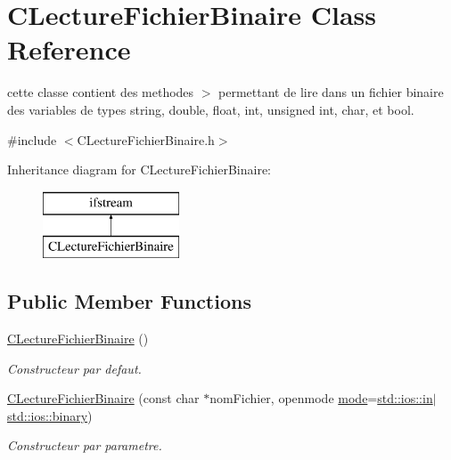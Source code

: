 \hypertarget{class_c_lecture_fichier_binaire}{\section{C\-Lecture\-Fichier\-Binaire Class Reference}
\label{class_c_lecture_fichier_binaire}
}


cette classe contient des methodes $>$ permettant de lire dans un fichier binaire des variables de types string, double, float, int, unsigned int, char, et bool.  




{\ttfamily \#include $<$C\-Lecture\-Fichier\-Binaire.\-h$>$}

Inheritance diagram for C\-Lecture\-Fichier\-Binaire\-:\begin{figure}[H]
\begin{center}
\leavevmode
\includegraphics[height=2.000000cm]{class_c_lecture_fichier_binaire}
\end{center}
\end{figure}
\subsection*{Public Member Functions}
\begin{DoxyCompactItemize}
\item 
\hyperlink{group__utilitaire_ga3a259905a2c14513846e6ecb8cf476ad}{C\-Lecture\-Fichier\-Binaire} ()
\begin{DoxyCompactList}\small\item\em Constructeur par defaut. \end{DoxyCompactList}\item 
\hyperlink{group__utilitaire_gac16ebab7b172408c2ba14605f61f0f84}{C\-Lecture\-Fichier\-Binaire} (const char $\ast$nom\-Fichier, openmode \hyperlink{glew_8h_a1e71d9c196e4683cc06c4b54d53f7ef5}{mode}=\hyperlink{glew_8h_a83ad0ee7f1e06b59c90271716e689080}{std\-::ios\-::in}$\vert$\hyperlink{glew_8h_a0ace813ee1f7020974174eb65d53ff0d}{std\-::ios\-::binary})
\begin{DoxyCompactList}\small\item\em Constructeur par parametre. \end{DoxyCompactList}\end{DoxyCompactItemize}
